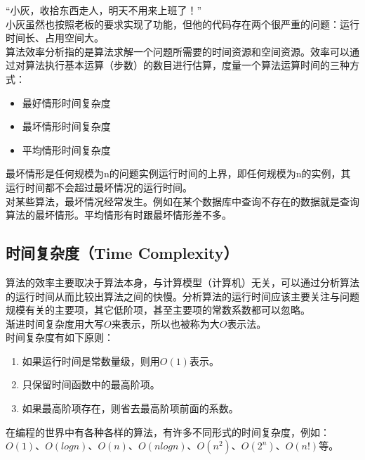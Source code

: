 “小灰，收拾东西走人，明天不用来上班了！”\\

小灰虽然也按照老板的要求实现了功能，但他的代码存在两个很严重的问题：运行时间长、占用空间大。\\

算法效率分析指的是算法求解一个问题所需要的时间资源和空间资源。效率可以通过对算法执行基本运算（步数）的数目进行估算，度量一个算法运算时间的三种方式：

\begin{itemize}
	\item 最好情形时间复杂度
	\item 最坏情形时间复杂度
	\item 平均情形时间复杂度
\end{itemize}

最坏情形是任何规模为n的问题实例运行时间的上界，即任何规模为n的实例，其运行时间都不会超过最坏情况的运行时间。\\

对某些算法，最坏情况经常发生。例如在某个数据库中查询不存在的数据就是查询算法的最坏情形。平均情形有时跟最坏情形差不多。\\

\subsection{时间复杂度（Time Complexity）}

算法的效率主要取决于算法本身，与计算模型（计算机）无关，可以通过分析算法的运行时间从而比较出算法之间的快慢。分析算法的运行时间应该主要关注与问题规模有关的主要项，其它低阶项，甚至主要项的常数系数都可以忽略。\\

渐进时间复杂度用大写$ O $来表示，所以也被称为大$ O $表示法。\\

时间复杂度有如下原则：

\begin{enumerate}
	\item 如果运行时间是常数量级，则用$ O(1) $表示。
	\item 只保留时间函数中的最高阶项。
	\item 如果最高阶项存在，则省去最高阶项前面的系数。
\end{enumerate}

在编程的世界中有各种各样的算法，有许多不同形式的时间复杂度，例如：$ O(1) $、$ O(logn) $、$ O(n) $、$ O(nlogn) $、$ O(n^2) $、$ O(2^n) $、$ O(n!) $等。\\


